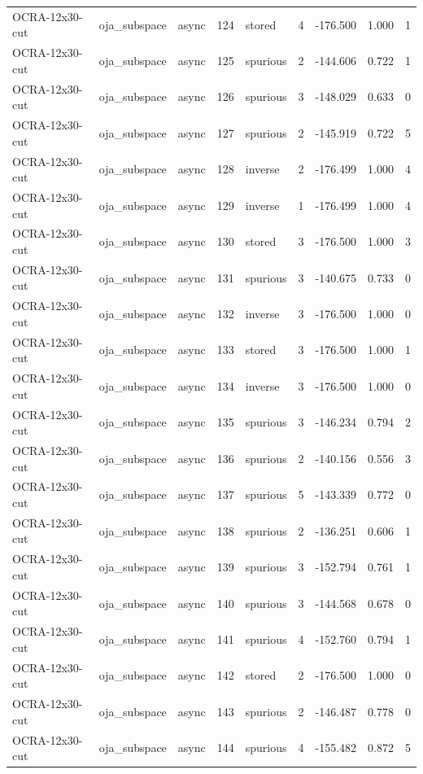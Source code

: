 \begin{tabular}{lllrlrrrr}
OCRA-12x30-cut & oja\_subspace & async & 124 & stored & 4 & -176.500 & 1.000 & 1 \\
OCRA-12x30-cut & oja\_subspace & async & 125 & spurious & 2 & -144.606 & 0.722 & 1 \\
OCRA-12x30-cut & oja\_subspace & async & 126 & spurious & 3 & -148.029 & 0.633 & 0 \\
OCRA-12x30-cut & oja\_subspace & async & 127 & spurious & 2 & -145.919 & 0.722 & 5 \\
OCRA-12x30-cut & oja\_subspace & async & 128 & inverse & 2 & -176.499 & 1.000 & 4 \\
OCRA-12x30-cut & oja\_subspace & async & 129 & inverse & 1 & -176.499 & 1.000 & 4 \\
OCRA-12x30-cut & oja\_subspace & async & 130 & stored & 3 & -176.500 & 1.000 & 3 \\
OCRA-12x30-cut & oja\_subspace & async & 131 & spurious & 3 & -140.675 & 0.733 & 0 \\
OCRA-12x30-cut & oja\_subspace & async & 132 & inverse & 3 & -176.500 & 1.000 & 0 \\
OCRA-12x30-cut & oja\_subspace & async & 133 & stored & 3 & -176.500 & 1.000 & 1 \\
OCRA-12x30-cut & oja\_subspace & async & 134 & inverse & 3 & -176.500 & 1.000 & 0 \\
OCRA-12x30-cut & oja\_subspace & async & 135 & spurious & 3 & -146.234 & 0.794 & 2 \\
OCRA-12x30-cut & oja\_subspace & async & 136 & spurious & 2 & -140.156 & 0.556 & 3 \\
OCRA-12x30-cut & oja\_subspace & async & 137 & spurious & 5 & -143.339 & 0.772 & 0 \\
OCRA-12x30-cut & oja\_subspace & async & 138 & spurious & 2 & -136.251 & 0.606 & 1 \\
OCRA-12x30-cut & oja\_subspace & async & 139 & spurious & 3 & -152.794 & 0.761 & 1 \\
OCRA-12x30-cut & oja\_subspace & async & 140 & spurious & 3 & -144.568 & 0.678 & 0 \\
OCRA-12x30-cut & oja\_subspace & async & 141 & spurious & 4 & -152.760 & 0.794 & 1 \\
OCRA-12x30-cut & oja\_subspace & async & 142 & stored & 2 & -176.500 & 1.000 & 0 \\
OCRA-12x30-cut & oja\_subspace & async & 143 & spurious & 2 & -146.487 & 0.778 & 0 \\
OCRA-12x30-cut & oja\_subspace & async & 144 & spurious & 4 & -155.482 & 0.872 & 5 \\

\end{tabular}
